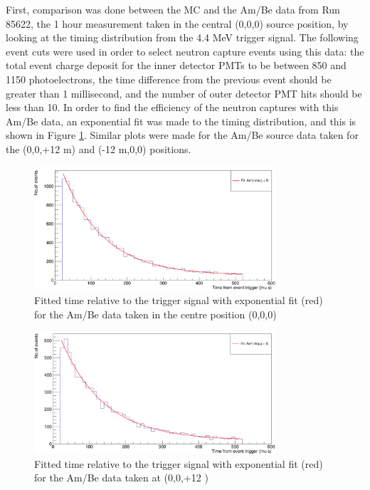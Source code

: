 First, comparison was done between the MC and the Am/Be data from Run 85622, the 1 hour measurement taken in the central (0,0,0) source position, by looking at the timing distribution from the 4.4 MeV trigger signal. The following event cuts were used in order to select neutron capture events using this data: the total event charge deposit for the inner detector PMTs to be between 850 and 1150 photoelectrons, the time difference from the previous event should be greater than 1 millisecond, and the number of outer detector PMT hits should be less than 10. In order to find the efficiency of the neutron captures with this Am/Be data, an exponential fit was made to the timing distribution, and this is shown in Figure \ref{fig:ambe_centre}. Similar plots were made for the Am/Be source data taken for the (0,0,+12 m) and (-12 m,0,0) positions.


\begin{figure}
    \centering
    \includegraphics[width=0.8\textwidth]{Figures/ambe_centre.png}
    \caption{Fitted time relative to the trigger signal with exponential fit (red) for the Am/Be data taken in the centre position (0,0,0)}
    \label{fig:ambe_centre}
\end{figure}

\begin{figure}
    \centering
    \includegraphics[width=0.8\textwidth]{Figures/ambe_data_+12z.png}
    \caption{Fitted time relative to the trigger signal with exponential fit (red) for the Am/Be data taken at (0,0,+12 )}
    \label{fig:ambe_+12z}
\end{figure}


